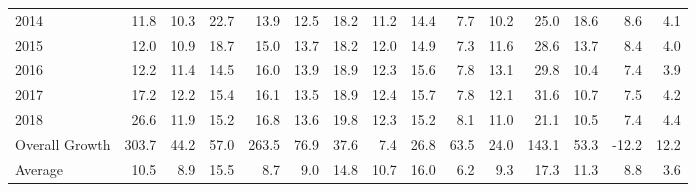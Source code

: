 \begin{tabular}{lrrrrrrrrrrrrrr}
2014           &     11.8 &             10.3 &          22.7 &       13.9 &           12.5 &            18.2 &         11.2 &        14.4 &          7.7 &      10.2 &          25.0 &           18.6 &      8.6 &          4.1 \\
2015           &     12.0 &             10.9 &          18.7 &       15.0 &           13.7 &            18.2 &         12.0 &        14.9 &          7.3 &      11.6 &          28.6 &           13.7 &      8.4 &          4.0 \\
2016           &     12.2 &             11.4 &          14.5 &       16.0 &           13.9 &            18.9 &         12.3 &        15.6 &          7.8 &      13.1 &          29.8 &           10.4 &      7.4 &          3.9 \\
2017           &     17.2 &             12.2 &          15.4 &       16.1 &           13.5 &            18.9 &         12.4 &        15.7 &          7.8 &      12.1 &          31.6 &           10.7 &      7.5 &          4.2 \\
2018           &     26.6 &             11.9 &          15.2 &       16.8 &           13.6 &            19.8 &         12.3 &        15.2 &          8.1 &      11.0 &          21.1 &           10.5 &      7.4 &          4.4 \\
Overall Growth &    303.7 &             44.2 &          57.0 &      263.5 &           76.9 &            37.6 &          7.4 &        26.8 &         63.5 &      24.0 &         143.1 &           53.3 &    -12.2 &         12.2 \\
Average        &     10.5 &              8.9 &          15.5 &        8.7 &            9.0 &            14.8 &         10.7 &        16.0 &          6.2 &       9.3 &          17.3 &           11.3 &      8.8 &          3.6 \\
\bottomrule
\end{tabular}
